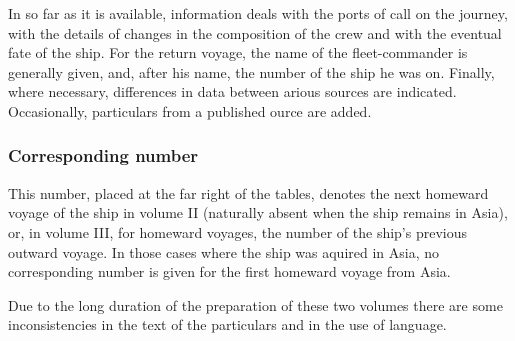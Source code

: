\documentclass[10pt,twocolumn,fleqn]{article}
\begin{document}
In so far as it is available, information deals with the ports of call on 
the journey, with the details of changes in the composition of the crew and 
with the eventual fate of the ship. For the return voyage, the name of the 
fleet-commander is generally given, and, after his name, the number of the 
ship he was on. Finally, where neces­sary, differences in data between 
arious sources are indicated. Occasionally, particulars from a published 
ource are added.

\subsubsection*{Corresponding number}
This number, placed at the far right of the tables, denotes the next homeward 
voyage of the ship in volume II (naturally absent when the ship remains in 
Asia), or, in volume III, for homeward voyages, the number of the 
ship's previous outward voyage. In those cases where the ship was aquired in 
Asia, no corresponding number is given for the first homeward voyage from Asia.

Due to the long duration of the preparation of these two volumes there are 
some inconsistencies in the text of the particulars and in the use of language.
\end{document}
